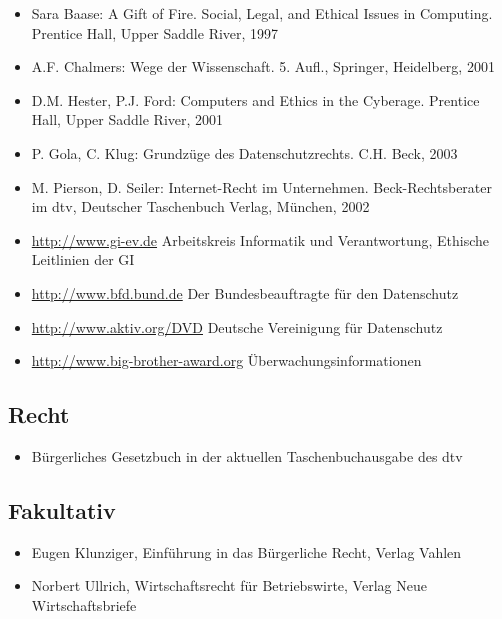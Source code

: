 \begin{itemize}
\tightlist
\item
  Sara Baase: A Gift of Fire. Social, Legal, and Ethical Issues in
  Computing. Prentice Hall, Upper Saddle River, 1997
\item
  A.F. Chalmers: Wege der Wissenschaft. 5. Aufl., Springer, Heidelberg,
  2001
\item
  D.M. Hester, P.J. Ford: Computers and Ethics in the Cyberage. Prentice
  Hall, Upper Saddle River, 2001
\item
  P. Gola, C. Klug: Grundzüge des Datenschutzrechts. C.H. Beck, 2003
\item
  M. Pierson, D. Seiler: Internet-Recht im Unternehmen.
  Beck-Rechtsberater im dtv, Deutscher Taschenbuch Verlag, München, 2002
\item
  \url{http://www.gi-ev.de} Arbeitskreis Informatik und Verantwortung,
  Ethische Leitlinien der GI
\item
  \url{http://www.bfd.bund.de} Der Bundesbeauftragte für den Datenschutz
\item
  \url{http://www.aktiv.org/DVD} Deutsche Vereinigung für Datenschutz
\item
  \url{http://www.big-brother-award.org} Überwachungsinformationen
\end{itemize}

\subsection*{Recht\label{/mi-2017/modulbeschreibungen-bachelor/BA_MUG}}\label{rechtpathlabelmi-2017modulbeschreibungen-bachelorbaux5fmug-2}

\begin{itemize}
\tightlist
\item
  Bürgerliches Gesetzbuch in der aktuellen Taschenbuchausgabe des dtv
\end{itemize}

\subsection*{Fakultativ\label{/mi-2017/modulbeschreibungen-bachelor/BA_MUG}}\label{fakultativpathlabelmi-2017modulbeschreibungen-bachelorbaux5fmug}

\begin{itemize}
\tightlist
\item
  Eugen Klunziger, Einführung in das Bürgerliche Recht, Verlag Vahlen
\item
  Norbert Ullrich, Wirtschaftsrecht für Betriebswirte, Verlag Neue
  Wirtschaftsbriefe
\end{itemize}

